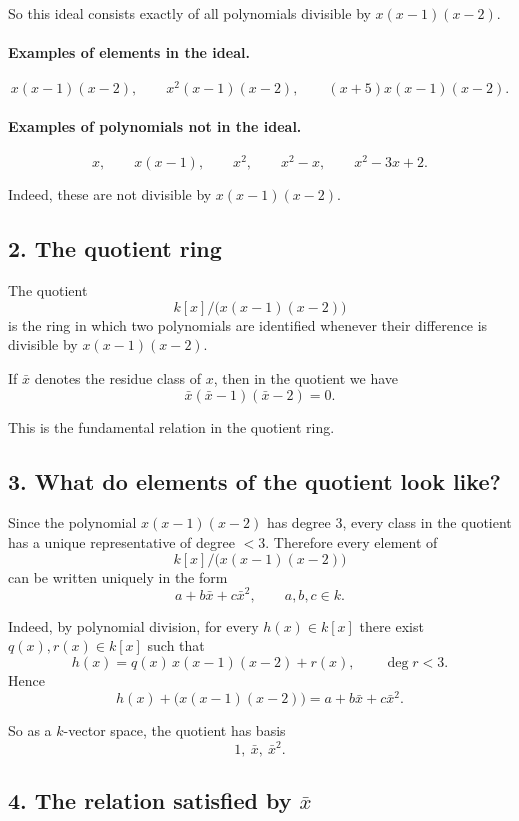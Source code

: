 \documentclass[12pt,a4paper]{article}
\theoremstyle{notespace}
\begin{document}
So this ideal consists exactly of all polynomials divisible by \(x(x-1)(x-2)\).

\paragraph{Examples of elements in the ideal.}
\[
x(x-1)(x-2),\qquad x^2(x-1)(x-2),\qquad (x+5)x(x-1)(x-2).
\]

\paragraph{Examples of polynomials not in the ideal.}
\[
x,\qquad x(x-1),\qquad x^2,\qquad x^2-x,\qquad x^2-3x+2.
\]

Indeed, these are not divisible by \(x(x-1)(x-2)\).

\subsection{2. The quotient ring}

The quotient
\[
k[x]/\bigl(x(x-1)(x-2)\bigr)
\]
is the ring in which two polynomials are identified whenever their difference is divisible by \(x(x-1)(x-2)\).

If \(\bar x\) denotes the residue class of \(x\), then in the quotient we have
\[
\bar x(\bar x-1)(\bar x-2)=0.
\]

This is the fundamental relation in the quotient ring.

\subsection{3. What do elements of the quotient look like?}

Since the polynomial \(x(x-1)(x-2)\) has degree \(3\), every class in the quotient has a unique representative of degree \(<3\). Therefore every element of
\[
k[x]/\bigl(x(x-1)(x-2)\bigr)
\]
can be written uniquely in the form
\[
a+b\bar x+c\bar x^2,
\qquad a,b,c\in k.
\]

Indeed, by polynomial division, for every \(h(x)\in k[x]\) there exist \(q(x),r(x)\in k[x]\) such that
\[
h(x)=q(x)\,x(x-1)(x-2)+r(x),
\qquad \deg r<3.
\]
Hence
\[
h(x)+\bigl(x(x-1)(x-2)\bigr)=a+b\bar x+c\bar x^2.
\]

So as a \(k\)-vector space, the quotient has basis
\[
1,\ \bar x,\ \bar x^2.
\]

\subsection{4. The relation satisfied by \(\bar x\)}
\end{document}
